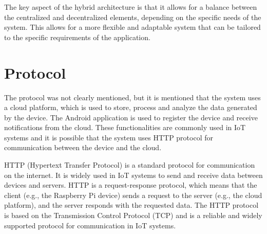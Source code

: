 \documentclass{report}
\begin{document}
\begin{multicols}{1}
    The key aspect of the hybrid architecture is that it allows for a balance between the centralized and decentralized elements, depending on the specific needs of the system. This allows for a more flexible and adaptable system that can be tailored to the specific requirements of the application.
    
    \section*{Protocol}
    The protocol was not clearly mentioned, but it is mentioned that the system uses a cloud platform, which is used to store, process and analyze the data generated by the device. The Android application is used to register the device and receive notifications from the cloud. These functionalities are commonly used in IoT systems and it is possible that the system uses HTTP protocol for communication between the device and the cloud.

    HTTP (Hypertext Transfer Protocol) is a standard protocol for communication on the internet. It is widely used in IoT systems to send and receive data between devices and servers. HTTP is a request-response protocol, which means that the client (e.g., the Raspberry Pi device) sends a request to the server (e.g., the cloud platform), and the server responds with the requested data. The HTTP protocol is based on the Transmission Control Protocol (TCP) and is a reliable and widely supported protocol for communication in IoT systems.
\end{multicols}
\end{document}
